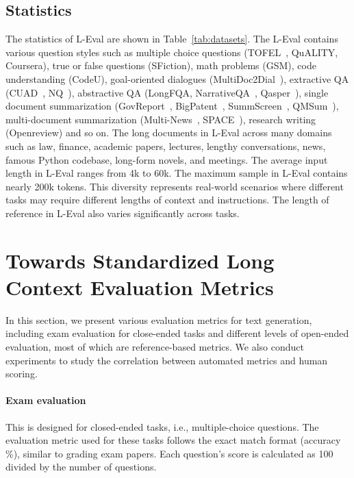 \subsection{Statistics}\label{sec:stat}
The statistics of L-Eval are shown in Table~\ref{tab:datasets}.
The L-Eval contains various question styles such as multiple choice questions (TOFEL~\citep{tseng2016towards}, QuALITY, Coursera), true or false questions (SFiction), math problems (GSM), code understanding (CodeU), goal-oriented dialogues (MultiDoc2Dial~\citep{Feng_2021}), extractive QA (CUAD~\citep{hendrycks2021cuad}, NQ~\citep{kwiatkowski-etal-2019-natural}), abstractive QA (LongFQA, NarrativeQA~\citep{kočiský2017narrativeqa}, Qasper~\citep{dasigi2021dataset}), single document summarization (GovReport~\citep{huang-etal-2021-efficient}, BigPatent~\citep{sharma-etal-2019-bigpatent}, SummScreen~\citep{chen2022summscreen}, QMSum~\citep{zhong2021qmsum}), multi-document summarization (Multi-News~\citep{fabbri2019multinews}, SPACE~\citep{angelidis-etal-2021-extractive}), research writing (Openreview) and so on. The long documents in L-Eval across many domains such as law, finance, academic papers, lectures, lengthy conversations, news, famous Python codebase, long-form novels, and meetings. The average input length in L-Eval ranges from 4k to 60k. The maximum sample in L-Eval contains nearly 200k tokens. This diversity represents real-world scenarios where different tasks may require different lengths of context and instructions. The length of reference in L-Eval also varies significantly across tasks.

\section{Towards Standardized Long Context Evaluation Metrics}
\label{sec:metric}
In this section, we present various evaluation metrics for text generation, including exam evaluation for close-ended tasks and different levels of open-ended evaluation, most of which are reference-based metrics.
We also conduct experiments to study the correlation between automated metrics and human scoring. 

\vspace{-0.7em}
\paragraph{Exam evaluation} This is designed for closed-ended tasks, i.e., multiple-choice questions. The evaluation metric used for these tasks follows the exact match format (accuracy \%), similar to grading exam papers. Each question's score is calculated as 100 divided by the number of questions. 

